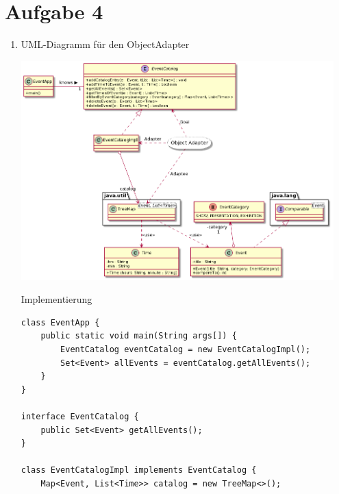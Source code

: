 \documentclass{article}
\begin{document}
	\section*{Aufgabe 4}
	\begin{enumerate}[label=(\alph*)]
		\item UML-Diagramm für den ObjectAdapter
		\begin{center}
			\includegraphics[width=0.95\textwidth]{./Aufgabe7_4a}
		\end{center}
		Implementierung
		\begin{lstlisting}[style=java, tabsize=2]
class EventApp {
	public static void main(String args[]) {
		EventCatalog eventCatalog = new EventCatalogImpl();
		Set<Event> allEvents = eventCatalog.getAllEvents();
	}
}

interface EventCatalog {
	public Set<Event> getAllEvents();
}

class EventCatalogImpl implements EventCatalog {
	Map<Event, List<Time>> catalog = new TreeMap<>();
	

\end{lstlisting}
\end{enumerate}
\end{document}
